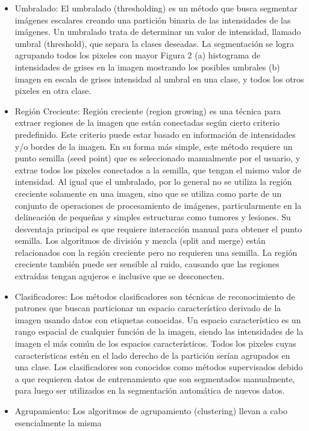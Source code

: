 \begin{itemize}
\item Umbralado: El umbralado (thresholding) es un m\'etodo que busca segmentar im\'agenes
escalares creando una partici\'on binaria de las intensidades de las im\'agenes. Un
umbralado trata de determinar un valor de intensidad, llamado umbral (threshold), que
separa la clases deseadas. La segmentaci\'on se logra agrupando todos los pixeles con mayor
Figura 2 (a) histograma de intensidades de grises en la imagen mostrando los posibles
umbrales (b) imagen en escala de grises intensidad al umbral en una clase, y todos los otros pixeles en otra clase.
\item Regi\'on Creciente: Regi\'on creciente (region growing) es una t\'ecnica para extraer regiones de la imagen que est\'an conectadas seg\'un cierto criterio predefinido. Este criterio puede estar basado en
informaci\'on de intensidades y/o bordes de la imagen. En su forma más simple, este m\'etodo requiere un punto semilla (seed point) que es seleccionado manualmente por el usuario, y extrae todos los pixeles conectados a la semilla, que tengan el mismo valor de intensidad. Al igual que el umbralado, por lo general no se utiliza la regi\'on creciente solamente en una imagen, sino que se utiliza como parte de un conjunto de operaciones de procesamiento de im\'agenes, particularmente en la delineaci\'on de pequeñas y simples estructuras como tumores y lesiones. Su desventaja principal es que requiere interacci\'on manual para obtener el punto semilla. Los algoritmos de divisi\'on y mezcla (split and merge) están relacionados con la regi\'on creciente pero no requieren una semilla. La regi\'on creciente tambi\'en puede ser sensible al ruido, causando que las regiones extra\'idas tengan agujeros e inclusive que se desconecten.
\item Clasificadores: Los m\'etodos clasificadores son t\'ecnicas de reconocimiento de patrones que buscan particionar un espacio caracter\'istico derivado de la imagen usando datos con etiquetas conocidas. Un espacio caracter\'istico es un rango espacial de cualquier funci\'on de la imagen, siendo las intensidades de la imagen el m\'as com\'un de los espacios caracter\'isticos. Todos los pixeles cuyas caracter\'isticas est\'en en el lado derecho de la partici\'on ser\'ian agrupados en una clase.
Los clasificadores son conocidos como m\'etodos supervisados debido a que requieren datos de entrenamiento que son segmentados manualmente, para luego ser utilizados en la segmentaci\'on autom\'atica de nuevos datos.
\item Agrupamiento: Los algoritmos de agrupamiento (clustering) llevan a cabo esencialmente la misma

\end{itemize}
